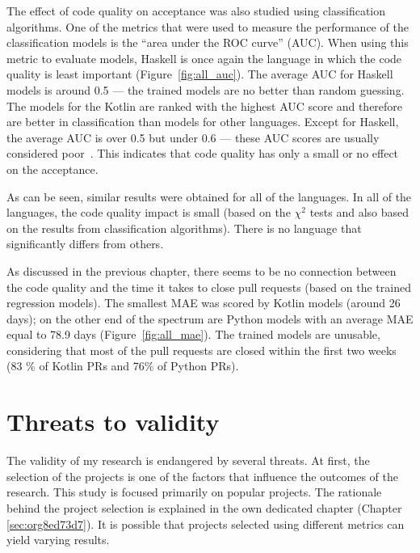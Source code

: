 \documentclass[digital,oneside,oldtable,nolof,nolot,nocover]{fithesis4}
\begin{document}
The effect of code quality on acceptance was also studied using
classification algorithms.  One of the metrics that were used to measure the
performance of the classification models is the ``area under the ROC curve''
(AUC). When using this metric to evaluate models, Haskell is once again
the language in which the code quality is least important
(Figure~\ref{fig:all_auc}). The average AUC for Haskell models is around
0.5 --- the trained models are no better than random guessing.
The models for the Kotlin are ranked with the highest AUC score and therefore
are better in classification than models for other languages.
Except for Haskell, the average AUC is over 0.5 but under 0.6 --- these AUC
scores are usually considered poor~\cite{logreg}. This indicates that code quality
has only a small or no effect on the acceptance.

As can be seen, similar results were obtained for all of the languages.
In all of the languages, the code quality impact is small (based on the \(\chi^2\) tests
and also based on the results from classification algorithms). There is no language
that significantly differs from others.

As discussed in the previous chapter, there seems to be no connection between
the code quality and the time it takes to close pull requests (based on the
trained regression models). The smallest MAE was scored by Kotlin models
(around 26 days); on the other end of the spectrum are Python models with an
average MAE equal to 78.9 days (Figure~\ref{fig:all_mae}). The trained models are unusable, considering
that most of the pull requests are closed within the first two weeks (83 \% of Kotlin
PRs and 76\% of Python PRs).
\FloatBarrier
\section{Threats to validity}
\label{sec:orgb33979f}
The validity of my research is endangered by several threats.
At first, the selection of the projects is one of the factors that influence
the outcomes of the research. This study is focused primarily on popular
projects. The rationale behind the project selection is explained in the own dedicated
chapter (Chapter \ref{sec:org8ed73d7}). It is possible that projects selected using different metrics can yield
varying results.
\end{document}
